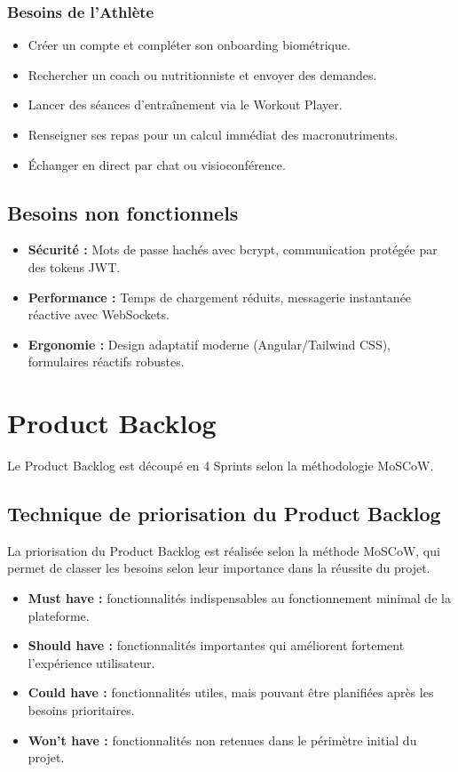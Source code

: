 \subsubsection{Besoins de l'Athlète}
\begin{itemize}
    \item Créer un compte et compléter son onboarding biométrique.
    \item Rechercher un coach ou nutritionniste et envoyer des demandes.
    \item Lancer des séances d'entraînement via le Workout Player.
    \item Renseigner ses repas pour un calcul immédiat des macronutriments.
    \item Échanger en direct par chat ou visioconférence.
\end{itemize}

\subsection{Besoins non fonctionnels}
\begin{itemize}
    \item \textbf{Sécurité :} Mots de passe hachés avec bcrypt, communication protégée par des tokens JWT.
    \item \textbf{Performance :} Temps de chargement réduits, messagerie instantanée réactive avec WebSockets.
    \item \textbf{Ergonomie :} Design adaptatif moderne (Angular/Tailwind CSS), formulaires réactifs robustes.
\end{itemize}

\section{Product Backlog}
Le Product Backlog est découpé en 4 Sprints selon la méthodologie MoSCoW.

\subsection{Technique de priorisation du Product Backlog}
La priorisation du Product Backlog est réalisée selon la méthode MoSCoW, qui permet de classer les besoins selon leur importance dans la réussite du projet.

\begin{itemize}
    \item \textbf{Must have :} fonctionnalités indispensables au fonctionnement minimal de la plateforme.
    \item \textbf{Should have :} fonctionnalités importantes qui améliorent fortement l'expérience utilisateur.
    \item \textbf{Could have :} fonctionnalités utiles, mais pouvant être planifiées après les besoins prioritaires.
    \item \textbf{Won't have :} fonctionnalités non retenues dans le périmètre initial du projet.
\end{itemize}

